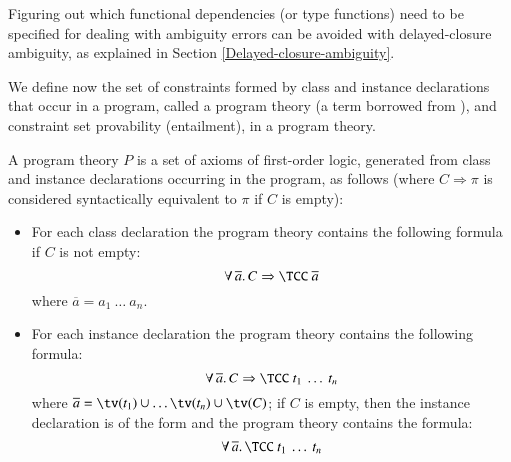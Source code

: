 \documentclass[review]{elsarticle}
\begin{document}
Figuring out which functional dependencies (or type functions) need to
be specified for dealing with ambiguity errors can be avoided with
delayed-closure ambiguity, as explained in Section
\ref{Delayed-closure-ambiguity}.

We define now the set of constraints formed by class and instance
declarations that occur in a program, called a program theory (a term
borrowed from \cite{Understanding-FDs-via-CHRs}), and constraint set
provability (entailment), in a program theory.

\begin{Definition}

A program theory $P$ is a set of axioms of first-order logic,
generated from class and instance declarations occurring in the
program, as follows (where $C \Rightarrow \pi$ is considered
syntactically equivalent to $\pi$ if $C$ is empty):

\begin{itemize}

\item For each class declaration
the program theory contains the following formula if $C$ is not empty:
    \[ \forall\,\overline{a}.\,C \Rightarrow \TCC\ \overline{a}\]
where $\overline{a} = a_1\: \ldots \: a_n$.



\item For each instance declaration
the program theory contains the following formula:
               \[ \forall\,\overline{a}.\,C \Rightarrow \TCC\ t_1\: \ldots \: t_n \]
where $\overline{a} = \tv(t_1) \cup \ldots \tv(t_n) \cup \tv(C)$;
if $C$ is empty, then the instance declaration is of the form 
and the program theory contains the formula:
     \[ \forall\,\overline{a}.\,\TCC\ t_1\: \ldots \: t_n \]


\end{itemize}
\end{Definition}
\end{document}
